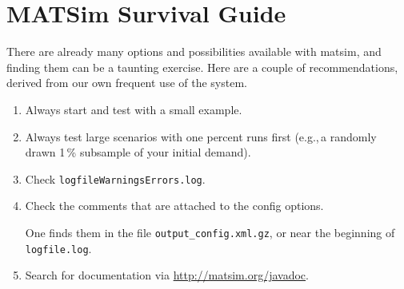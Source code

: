 \section{MATSim Survival Guide}
\label{sec:survival}

There are already many options and possibilities available with \gls{matsim}, and finding them can be a taunting exercise.  Here are a couple of recommendations, derived from our own frequent use of the system.
\begin{enumerate}

\item Always start and test with a small example.

\item Always test large scenarios with one percent runs first (e.g.,\,a randomly drawn 1\,\% subsample of your initial demand).

\item Check \lstinline{logfileWarningsErrors.log}.

\item Check the comments that are attached to the config options.

One finds them in the file \lstinline{output_config.xml.gz}, or near the beginning of \lstinline{logfile.log}.

\item Search for documentation via \url{http://matsim.org/javadoc}.

\end{enumerate}


